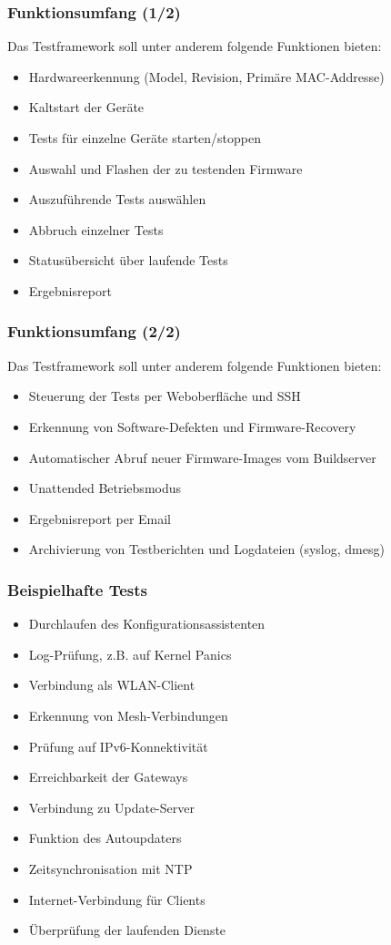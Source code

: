 \documentclass[accentcolor=tud6b,colorbacktitle,inverttitle,landscape,german,presentation,t]{tudbeamer}
\begin{document}
	\begin{frame}
		\frametitle{Funktionsumfang (1/2)}
		\vfill
		Das Testframework soll unter anderem folgende Funktionen bieten:
		\vfill
		\begin{itemize}[<+->]
			\item Hardwareerkennung (Model, Revision, Primäre MAC-Addresse)
			\item Kaltstart der Geräte
			\item Tests für einzelne Geräte starten/stoppen
			\item Auswahl und Flashen der zu testenden Firmware
			\item Auszuführende Tests auswählen
			\item Abbruch einzelner Tests
			\item Statusübersicht über laufende Tests
			\item Ergebnisreport
		\end{itemize}	
	\end{frame}
	
	\begin{frame}
		\frametitle{Funktionsumfang (2/2)}
		\vfill
		Das Testframework soll unter anderem folgende Funktionen bieten:
		\vfill
		\begin{itemize}[<+->]
			\item Steuerung der Tests per Weboberfläche und SSH
			\item Erkennung von Software-Defekten und Firmware-Recovery
			\item Automatischer Abruf neuer Firmware-Images vom Buildserver
			\item Unattended Betriebsmodus
			\item Ergebnisreport per Email
			\item Archivierung von Testberichten und Logdateien (syslog, dmesg)
		\end{itemize}	
	\end{frame}
	\begin{frame}
		\frametitle{Beispielhafte Tests}
		\begin{itemize}[<+->]
		    \item Durchlaufen des Konfigurationsassistenten
		    \item Log-Prüfung, z.B. auf Kernel Panics
		    \item Verbindung als WLAN-Client
		    \item Erkennung von Mesh-Verbindungen
		    \item Prüfung auf IPv6-Konnektivität
		    \item Erreichbarkeit der Gateways
		    \item Verbindung zu Update-Server
		    \item Funktion des Autoupdaters
		    \item Zeitsynchronisation mit NTP
		    \item Internet-Verbindung für Clients
		    \item Überprüfung der laufenden Dienste
 		\end{itemize}
	\end{frame}
\end{document}
